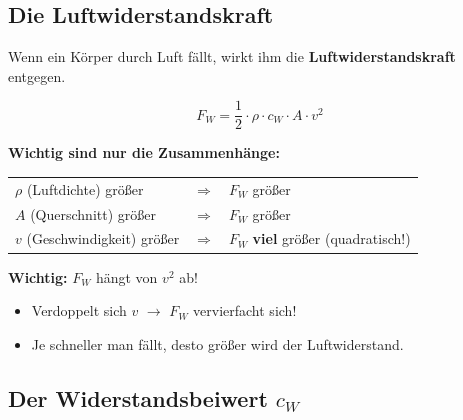 \documentclass[11pt,a4paper]{article}
\begin{document}
\vspace{0.5cm}

\subsection{Die Luftwiderstandskraft}

Wenn ein Körper durch Luft fällt, wirkt ihm die \textbf{Luftwiderstandskraft} entgegen.

\begin{formelbox}
\[
F_W = \frac{1}{2} \cdot \rho \cdot c_W \cdot A \cdot v^2
\]

\textbf{Wichtig sind nur die Zusammenhänge:}
\begin{center}
\begin{tabular}{lcl}
$\rho$ (Luftdichte) größer & $\Rightarrow$ & $F_W$ größer \\
$A$ (Querschnitt) größer & $\Rightarrow$ & $F_W$ größer \\
$v$ (Geschwindigkeit) größer & $\Rightarrow$ & $F_W$ \textbf{viel} größer (quadratisch!)
\end{tabular}
\end{center}
\end{formelbox}

\begin{merksatz}
\textbf{Wichtig:} $F_W$ hängt von $v^2$ ab!
\begin{itemize}
\item Verdoppelt sich $v$ $\rightarrow$ $F_W$ vervierfacht sich!
\item Je schneller man fällt, desto größer wird der Luftwiderstand.
\end{itemize}
\end{merksatz}

\subsection{Der Widerstandsbeiwert $c_W$}

\begin{center}
\end{center}
\end{document}
